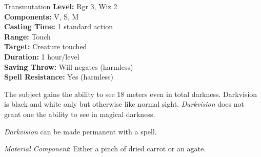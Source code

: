 {Transmutation}
{
	\textbf{Level:}
	Rgr 3, Wiz 2\\
	\textbf{Components:}
	V, S, M\\
	\textbf{Casting Time:}
	1 standard action\\
	\textbf{Range:}
	Touch\\
	\textbf{Target:}
	Creature touched\\
	\textbf{Duration:}
	1 hour/level\\
	\textbf{Saving Throw:}
	Will negates (harmless)\\
	\textbf{Spell Resistance:}
	Yes (harmless)\\
}
{
	The subject gains the ability to see 18 meters even in total darkness. Darkvision is black and white only but otherwise like normal sight. \emph{Darkvision} does not grant one the ability to see in magical darkness.

	\emph{Darkvision} can be made permanent with a  spell.

	\textit{Material Component}:
	Either a pinch of dried carrot or an agate.

}
